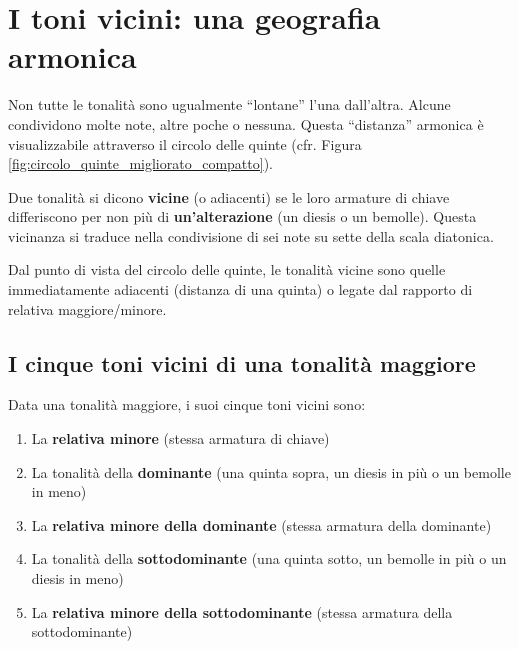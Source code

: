 \section{I toni vicini: una geografia armonica}
\label{sec:toni_vicini}

Non tutte le tonalità sono ugualmente ``lontane'' l'una dall'altra. Alcune condividono molte note, altre poche o nessuna. Questa ``distanza'' armonica è visualizzabile attraverso il circolo delle quinte (cfr. Figura \ref{fig:circolo_quinte_migliorato_compatto}).

\begin{definizione}
	\label{def:tonalita_vicine}
	Due tonalità si dicono \textbf{vicine} (o adiacenti) se le loro armature di chiave differiscono per non più di \textbf{un'alterazione} (un diesis o un bemolle). Questa vicinanza si traduce nella condivisione di sei note su sette della scala diatonica.
	
	Dal punto di vista del circolo delle quinte, le tonalità vicine sono quelle immediatamente adiacenti (distanza di una quinta) o legate dal rapporto di relativa maggiore/minore.
\end{definizione}

\subsection{I cinque toni vicini di una tonalità maggiore}
\label{subsec:toni_vicini_maggiore}

\begin{regola}
	\label{reg:toni_vicini_maggiore}
	Data una tonalità maggiore, i suoi cinque toni vicini sono:
	
	\begin{enumerate}
		\item La \textbf{relativa minore} (stessa armatura di chiave)
		\item La tonalità della \textbf{dominante} (una quinta sopra, un diesis in più o un bemolle in meno)
		\item La \textbf{relativa minore della dominante} (stessa armatura della dominante)
		\item La tonalità della \textbf{sottodominante} (una quinta sotto, un bemolle in più o un diesis in meno)
		\item La \textbf{relativa minore della sottodominante} (stessa armatura della sottodominante)
	\end{enumerate}
\end{regola}


